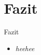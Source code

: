 \documentclass{beamer}
\begin{document}



\section{Fazit}
\begin{frame}{Fazit}
	\begin{itemize}
		\item{\emph{heehee}}
	\end{itemize}
\end{frame}

\end{document}
